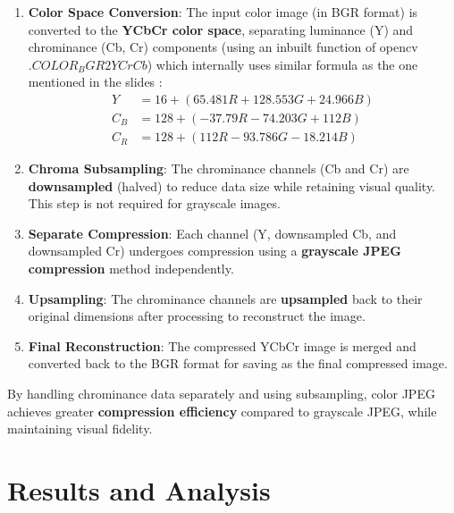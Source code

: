 \documentclass[12pt, a4paper]{report}
\begin{document}
	\begin{enumerate}
		\item \textbf{Color Space Conversion}: 
		The input color image (in BGR format) is converted to the \textbf{YCbCr color space}, separating luminance (Y) and chrominance (Cb, Cr) components (using an inbuilt function of opencv $.COLOR_BGR2YCrCb$) which internally uses similar formula as the one mentioned in the slides :
		\begin{align*}
			Y &= 16 + (65.481R + 128.553G + 24.966B) \\
			C_B &= 128 + (-37.79R - 74.203G + 112B) \\
			C_R &= 128 + (112R - 93.786G - 18.214B)
		\end{align*}
		
		\item \textbf{Chroma Subsampling}: 
		The chrominance channels (Cb and Cr) are \textbf{downsampled} (halved) to reduce data size while retaining visual quality. This step is not required for grayscale images.
		
		\item \textbf{Separate Compression}: 
		Each channel (Y, downsampled Cb, and downsampled Cr) undergoes compression using a \textbf{grayscale JPEG compression} method independently.
		
		\item \textbf{Upsampling}: 
		The chrominance channels are \textbf{upsampled} back to their original dimensions after processing to reconstruct the image.
		
		\item \textbf{Final Reconstruction}: 
		The compressed YCbCr image is merged and converted back to the BGR format for saving as the final compressed image.
	\end{enumerate}
	
	By handling chrominance data separately and using subsampling, color JPEG achieves greater \textbf{compression efficiency} compared to grayscale JPEG, while maintaining visual fidelity.
	
	
	\chapter{Results and Analysis}
	
\end{document}
